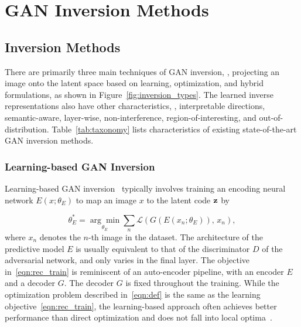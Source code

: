 \section{GAN Inversion Methods}
\label{sec:model}



\subsection{Inversion Methods}
\label{sec:techniques}
There are primarily three main techniques of GAN inversion, \ie, projecting an image onto the latent space based on learning, optimization, and hybrid formulations, as shown in Figure~\ref{fig:inversion_types}.
The learned inverse representations also have other characteristics, \ie, interpretable directions, semantic-aware, layer-wise, non-interference, region-of-interesting, and out-of-distribution. 
Table~\ref{tab:taxonomy} lists characteristics of existing state-of-the-art GAN inversion methods.

\figtype

\subsubsection{Learning-based GAN Inversion}
\label{sec:learning-based}
Learning-based GAN inversion~\cite{perarnau2016invertible,zhu2016generative,bau2019inverting} typically involves training an encoding neural network $E(x; \theta_E)$ to map an image $x$ to the latent code $\mathbf{z}$ by

\begin{equation}
\theta_E^* = \underset{\theta_E}{\arg\min} \sum_{n} \mathcal{L} (G(E(x_n; \theta_E)), \,x_n),
\label{eqn:rec_train}
\end{equation}
where $x_n$ denotes the $n$-th image in the dataset.
The architecture of the predictive model $E$ is usually equivalent to that of the discriminator $D$ of the adversarial network, and only varies in the final layer.
The objective in~\eqref{eqn:rec_train} is reminiscent of an auto-encoder pipeline, with an encoder $E$ and a decoder $G$. The decoder $G$ is fixed throughout the training.
While the optimization problem described in~\eqref{eqn:def} is the same as the learning objective~\eqref{eqn:rec_train}, the learning-based approach often achieves better performance than direct optimization and does not fall into local optima~\cite{zhu2016generative,aberdam2020invert}.

